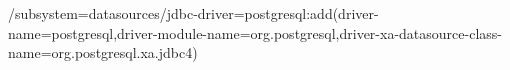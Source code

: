  /subsystem=datasources/jdbc-driver=postgresql:add(driver-name=postgresql,driver-module-name=org.postgresql,driver-xa-datasource-class-name=org.postgresql.xa.jdbc4)